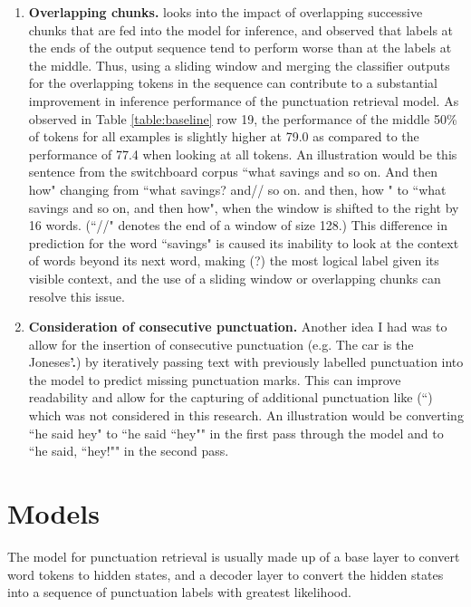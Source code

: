\documentclass[a4paper]{article}
\begin{document}
\begin{multicols}{2}
\begin{enumerate}
    \item \textbf{Overlapping chunks.}
    \citet{chunkmerging} looks into the impact of overlapping successive chunks that are fed into the model for inference, and observed that labels at the ends of the output sequence tend to perform worse than at the labels at the middle. Thus, using a sliding window and merging the classifier outputs for the overlapping tokens in the sequence can contribute to a substantial improvement in inference performance of the punctuation retrieval model. As observed in Table \ref{table:baseline} row 19, the performance of the middle 50\% of tokens for all examples is slightly higher at 79.0 as compared to the performance of 77.4 when looking at all tokens. 
    An illustration would be this sentence from the switchboard corpus ``what savings and so on. And then how" changing from ``what savings? and// so on. and then, how " to ``what savings and so on, and then how", when the window is shifted to the right by 16 words. (``//" denotes the end of a window of size 128.) This difference in prediction for the word ``savings" is caused its inability to look at the context of words beyond its next word, making (?) the most logical label given its visible context, and the use of a sliding window or overlapping chunks can resolve this issue.
    
    \item \textbf{Consideration of consecutive punctuation.}
    Another idea I had was to allow for the insertion of consecutive punctuation (e.g. The car is the Joneses\textbf{’.}) by iteratively passing text with previously labelled punctuation into the model to predict missing punctuation marks. This can improve readability and allow for the capturing of additional punctuation like (``) which was not considered in this research. An illustration would be converting ``he said hey" to ``he said ``hey"" in the first pass through the model and to ``he said, ``hey!"" in the second pass.
\end{enumerate}

\section{Models}
The model for punctuation retrieval is usually made up of a base layer to convert word tokens to hidden states, and a decoder layer to convert the hidden states into a sequence of punctuation labels with greatest likelihood.


\end{multicols}
\end{document}
